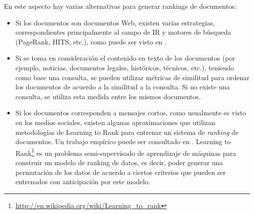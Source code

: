    En este aspecto hay varias alternativas para generar rankings de
   documentos:

\begin{itemize}
\item Si los documentos son documentos Web, existen
     varias estrategias, correspondientes principalmente al campo de
     IR y motores de búsqueda (PageRank, HITS, etc.), como puede ser
     visto en \cite{signorini2005survey}.
\item Si se toma en consideración el contenido en texto de los
     documentos (por ejemplo, noticias, documentos legales,
     históricos, técnicos, etc.), teniendo como base una consulta, se
     pueden utilizar métricas de similitud para ordenar los documentos
     de acuerdo a la similitud a la consulta. Si no existe una
     consulta, se utiliza esta medida entre los mismos documentos.
\item Si los documentos corresponden a mensajes cortos, como usualmente
     es visto en los medios sociales, existen algunas aproximaciones
     que utilizan metodologías de Learning to Rank para entrenar un
     sistema de \emph{ranking} de documentos. Un trabajo empírico puede ser
     consultado en \cite{Duan:2010:ESL:1873781.1873815}. Learning to
     Rank\footnote{\href{http://en.wikipedia.org/wiki/Learning\_to\_rank}{http://en.wikipedia.org/wiki/Learning\_to\_rank} }
     es un problema semi-supervisado de aprendizaje de
     máquinas para construir un modelo de ranking de datos, es decir,
     poder generar una permutación de los datos de acuerdo a ciertos
     criterios que pueden ser entrenados con anticipación por este
     modelo.
\end{itemize}
